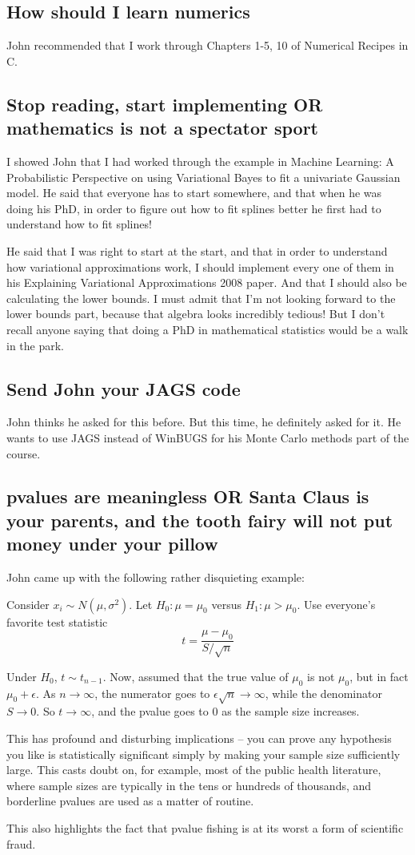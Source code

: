 \documentclass{amsart}
\begin{document}
\subsection{How should I learn numerics}
John recommended that I work through Chapters 1-5, 10 of Numerical Recipes
in C.

\subsection{Stop reading, start implementing OR mathematics is not a spectator sport}
I showed John that I had worked through the example in Machine Learning: A
Probabilistic Perspective on using Variational Bayes to fit a univariate
Gaussian model. He said that everyone has to start somewhere, and that when
he was doing his PhD, in order to figure out how to fit splines better he first
had to understand how to fit splines!

He said that I was right to start at the start, and that in order to understand
how variational approximations work, I should implement every one of them in
his Explaining Variational Approximations 2008 paper. And that I should also
be calculating the lower bounds. I must admit that I'm not looking forward to
the lower bounds part, because that algebra looks incredibly tedious! But I don't
recall anyone saying that doing a PhD in mathematical statistics would be a
walk in the park.

\subsection{Send John your JAGS code}
John thinks he asked for this before. But this time, he definitely asked for it.
He wants to use JAGS instead of WinBUGS for his Monte Carlo methods part of the
course.

\subsection{pvalues are meaningless OR Santa Claus is your parents, and the tooth fairy will not put money under your pillow}
John came up with the following rather disquieting example:

Consider $x_i \sim N(\mu, \sigma^2)$. Let $H_0: \mu = \mu_0$ versus
$H_1: \mu > \mu_0$. Use everyone's favorite test statistic
\[
t = \frac{\mu - \mu_0}{S/\sqrt{n}}
\]

Under $H_0$, $t \sim t_{n-1}$. Now, assumed that the true value of $\mu_0$ is not $\mu_0$, but in fact
$\mu_0 + \epsilon$. As $n \to \infty$, the numerator goes to $\epsilon \sqrt{n} \to \infty$, while the
denominator $S \to 0$. So $t \to \infty$, and the pvalue goes to $0$ as the sample size increases.

This has profound and disturbing implications -- you can prove any hypothesis you like is
statistically significant simply by making your sample size sufficiently large. This casts
doubt on, for example, most of the public health literature, where sample sizes are typically
in the tens or hundreds of thousands, and borderline pvalues are used as a matter of routine.

This also highlights the fact that pvalue fishing is at its worst a form of scientific fraud.
\end{document}
